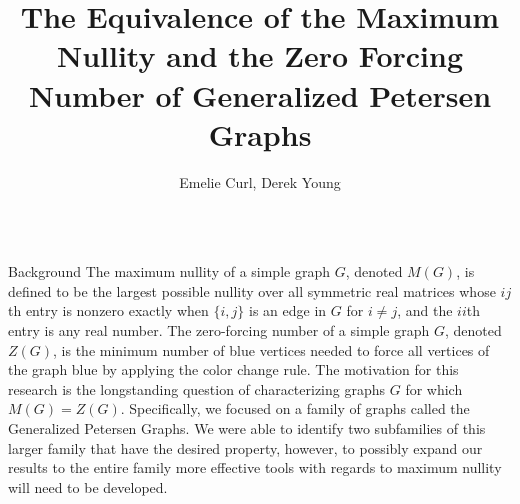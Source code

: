 \documentclass[final]{beamer}
\title{The Equivalence of the Maximum Nullity and the Zero Forcing Number of Generalized Petersen Graphs}
\author{Emelie Curl, Derek Young }
\institute{Iowa State University, Ames, IA}
\def\red{\color{red}}
\newcommand{\R}{\mathbb{R}}
\newcommand{\Rnn}{\R^{n\times n}}
\newcommand{\bit}{\begin{itemize}}
\begin{document}
\begin{frame}{}
  \begin{columns}[t]

    \begin{column}{0.282\linewidth} %

      \begin{block}{\red Background}
The maximum nullity of a simple graph $G$, denoted $M(G)$, is defined to be the largest possible nullity over all symmetric real matrices whose $ij$th entry is nonzero exactly when $\{i,j\}$ is an edge in $G$ for $i\neq j$, and the {$ii$}th entry is any real number. The zero-forcing number of a simple graph $G$, denoted $Z(G)$, is the minimum number of blue vertices needed to force all vertices of the graph blue by applying the color change rule. The motivation for this research is the longstanding question of characterizing graphs $G$ for which $M(G)=Z(G)$. Specifically, we focused on a family of graphs called the Generalized Petersen Graphs. We were able to identify two subfamilies of this larger family that have the desired property, however, to possibly expand our results to the entire family more effective tools with regards to maximum nullity will need to be developed.
\end{block}

\end{column}
\end{columns}
\end{frame}
\end{document}

